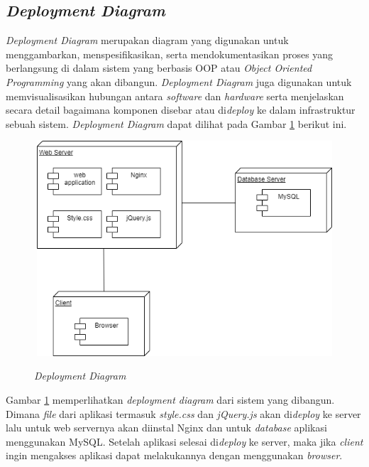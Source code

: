 \subsection{\textit{Deployment Diagram}}
	\textit{Deployment Diagram} merupakan diagram yang digunakan untuk menggambarkan, menspesifikasikan, serta mendokumentasikan proses yang berlangsung di dalam sistem yang berbasis OOP atau \textit{Object Oriented Programming} yang akan dibangun. \textit{Deployment Diagram} juga digunakan untuk memvisualisasikan hubungan antara \textit{software} dan \textit{hardware} serta menjelaskan secara detail bagaimana komponen disebar atau di\textit{deploy} ke dalam infrastruktur sebuah sistem. \textit{Deployment Diagram} dapat dilihat pada Gambar \ref{deployment} berikut ini.
	
	


	\begin{figure}[H]
		\centering
		{\includegraphics [width = 12cm, height= 8cm]{gambar/deployment}}
		\caption{\textit{Deployment Diagram}}
		\label{deployment}
	\end{figure}
	\par Gambar \ref*{deployment} memperlihatkan \textit{deployment diagram} dari sistem yang dibangun. Dimana \textit{file} dari aplikasi termasuk \textit{style.css} dan \textit{jQuery.js} akan di\textit{deploy} ke server lalu untuk web servernya akan diinstal Nginx dan untuk \textit{database} aplikasi menggunakan MySQL. Setelah aplikasi selesai di\textit{deploy} ke server, maka jika \textit{client} ingin mengakses aplikasi dapat melakukannya dengan menggunakan \textit{browser}.

